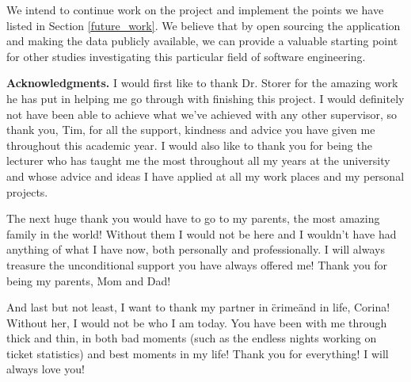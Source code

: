 \documentclass{mpaper}
\begin{document}
We intend to continue work on the project and implement the points we have listed in Section \ref{future_work}. We believe
that by open sourcing the application and making the data publicly available, we can provide a valuable starting point 
for other studies investigating this particular field of software engineering.

\vskip8pt \noindent
{\bf Acknowledgments.}
I would first like to thank Dr. Storer for the amazing work he has put in helping me go through with finishing 
this project. I would definitely not have been able to achieve what we've achieved with any other supervisor, so 
thank you, Tim, for all the support, kindness and advice you have given me throughout this academic year. I would 
also like to thank you for being the lecturer who has taught me the most throughout all my years at the university
and whose advice and ideas I have applied at all my work places and my personal projects.

The next huge thank you would have to go to my parents, the most amazing family in the world! Without them I would 
not be here and I wouldn't have had anything of what I have now, both personally and professionally. 
I will always treasure the unconditional support you have always offered me! Thank you for being my parents, Mom and Dad!

And last but not least, I want to thank my partner in \"crime\" and in life, Corina! Without her, I would not be who I 
am today. You have been with me through thick and thin, in both bad moments (such as the endless nights working 
on ticket statistics) and best moments in my life! Thank you for everything! I will always love you!



\end{document}
